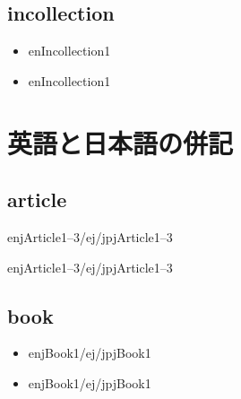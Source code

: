 \documentclass[10pt, a4paper]{jsarticle}
\newcommand{\putlst}[1]{
  \noindent\makebox[\linewidth]{\rule{\linewidth}{0.4pt}}\vspace{-1.5zw}
  \vspace{-1.8zw}
  \noindent\makebox[\linewidth]{\rule{\linewidth}{0.4pt}}\vspace{0.5zw}\par
}
\begin{document}
\subsection{incollection}

\putlst{bib/enincollection.bib}

\begin{bibunit}[IEEJtran]
  \begin{itemize}
    \item enIncollection1 \cite{enIncollection1}
  \end{itemize}
  {\small {}}
\end{bibunit}
\begin{bibunit}[jIEEEtran]
  \begin{itemize}
    \item enIncollection1 \cite{enIncollection1}
  \end{itemize}
  {\small {}}
\end{bibunit}


\clearpage
\section{英語と日本語の併記}

\subsection{article}

\putlst{bib/ejarticle.bib}

\begin{bibunit}[IEEJtran]
  enjArticle1--3/ej/jpjArticle1--3 \cite{enjArticle1/ej/jpjArticle1,enjArticle2/ej/jpjArticle2,enjArticle3/ej/jpjArticle3}
  {\small {}}
\end{bibunit}
\begin{bibunit}[jIEEEtran]
  enjArticle1--3/ej/jpjArticle1--3 \cite{enjArticle1/ej/jpjArticle1,enjArticle2/ej/jpjArticle2,enjArticle3/ej/jpjArticle3}
  {\small {}}
\end{bibunit}

\subsection{book}

\putlst{bib/ejbook.bib}

\begin{bibunit}[IEEJtran]
  \begin{itemize}
    \item enjBook1/ej/jpjBook1 \cite{enjBook1/ej/jpjBook1}
  \end{itemize}
  {\small {}}
\end{bibunit}
\begin{bibunit}[jIEEEtran]
  \begin{itemize}
    \item enjBook1/ej/jpjBook1 \cite{enjBook1/ej/jpjBook1}
  \end{itemize}
  {\small {}}
\end{bibunit}
\end{document}
